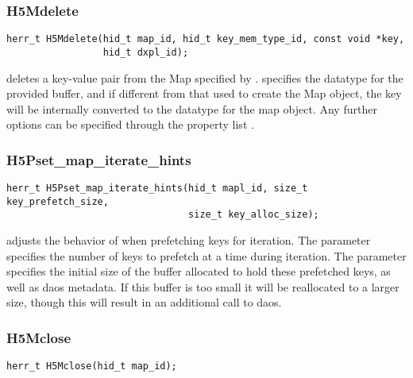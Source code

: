 \documentclass[../design_doc.tex]{subfiles}
\begin{document}
\subsubsection{H5Mdelete}

\begin{verbatim}
herr_t H5Mdelete(hid_t map_id, hid_t key_mem_type_id, const void *key,
                 hid_t dxpl_id);
\end{verbatim}

 deletes a key-value pair from the Map specified by .  specifies the datatype for the provided  buffer, and if different from that used to create the Map object, the key will be internally converted to the datatype for the map object. Any further options can be specified through the property list .

\subsubsection{H5Pset\_map\_iterate\_hints}

\begin{verbatim}
herr_t H5Pset_map_iterate_hints(hid_t mapl_id, size_t key_prefetch_size,
                                size_t key_alloc_size);
\end{verbatim}

 adjusts the behavior of  when prefetching keys for iteration. The  parameter specifies the number of keys to prefetch at a time during iteration. The  parameter specifies the initial size of the buffer allocated to hold these prefetched keys, as well as \acrshort{daos} metadata. If this buffer is too small it will be reallocated to a larger size, though this will result in an additional call to \acrshort{daos}.

\subsubsection{H5Mclose}

\begin{verbatim}
herr_t H5Mclose(hid_t map_id);
\end{verbatim}
\end{document}
